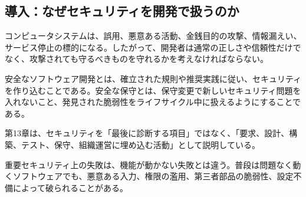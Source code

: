 \subsection{導入：なぜセキュリティを開発で扱うのか}
コンピュータシステムは、誤用、悪意ある活動、金銭目的の攻撃、情報漏えい、サービス停止の標的になる。したがって、開発者は通常の正しさや信頼性だけでなく、攻撃されても守るべきものを守れるかを考えなければならない。

安全なソフトウェア開発とは、確立された規則や推奨実践に従い、セキュリティを作り込むことである。安全な保守とは、保守変更で新しいセキュリティ問題を入れないこと、発見された脆弱性をライフサイクル中に扱えるようにすることである。

第13章は、セキュリティを「最後に診断する項目」ではなく、「要求、設計、構築、テスト、保守、組織運営に埋め込む活動」として説明している。

\begin{notebox}{重要}セキュリティ上の失敗は、機能が動かない失敗とは違う。普段は問題なく動くソフトウェアでも、悪意ある入力、権限の濫用、第三者部品の脆弱性、設定不備によって破られることがある。\end{notebox}
